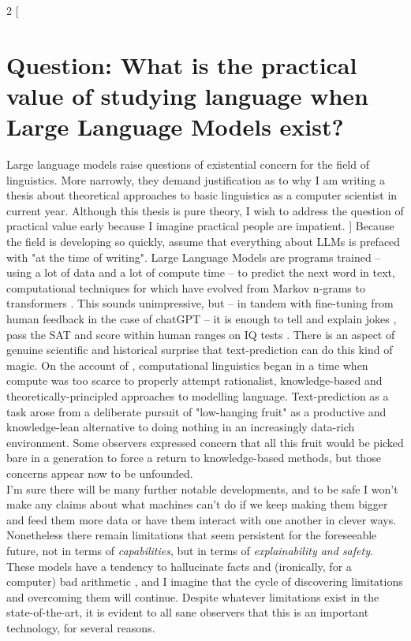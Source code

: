 \clearpage
\begin{fullwidth}
\begin{multicols}{2}
[
\section{\textbf{Question:} What is the practical value of studying language when Large Language Models exist?}
Large language models raise questions of existential concern for the field of linguistics. More narrowly, they demand justification as to why I am writing a thesis about theoretical approaches to basic linguistics as a computer scientist in current year. Although this thesis is pure theory, I wish to address the question of practical value early because I imagine practical people are impatient.
]
 Because the field is developing so quickly, assume that everything about LLMs is prefaced with "at the time of writing". Large Language Models are programs trained -- using a lot of data and a lot of compute time -- to predict the next word in text, computational techniques for which have evolved from Markov n-grams to transformers \citep{vaswani_attention_2017}. This sounds unimpressive, but -- in tandem with fine-tuning from human feedback in the case of chatGPT \citep{openai_chatgpt_2022} -- it is enough to tell and explain jokes \citep{bastian_google_2022}, pass the SAT \citep{teddy_teddynpc_i_2022} and score within human ranges on IQ tests \citep{thompson_gpt-35_2022}. There is an aspect of genuine scientific and historical surprise that text-prediction can do this kind of magic. On the account of \citep{mcshane_linguistics_2021}, computational linguistics began in a time when compute was too scarce to properly attempt rationalist, knowledge-based and theoretically-principled approaches to modelling language. Text-prediction as a task arose from a deliberate pursuit of "low-hanging fruit" as a productive and knowledge-lean alternative to doing nothing in an increasingly data-rich environment. Some observers \citep{church_pendulum_2011} expressed concern that all this fruit would be picked bare in a generation to force a return to knowledge-based methods, but those concerns appear now to be unfounded.\\

I'm sure there will be many further notable developments, and to be safe I won't make any claims about what machines can't do if we keep making them bigger and feed them more data or have them interact with one another in clever ways. Nonetheless there remain limitations that seem persistent for the foreseeable future, not in terms of \emph{capabilities}, but in terms of \emph{explainability and safety}. These models have a tendency to hallucinate facts and (ironically, for a computer) bad arithmetic \citep{hendrycks_measuring_2021}, and I imagine that the cycle of discovering limitations and overcoming them will continue. Despite whatever limitations exist in the state-of-the-art, it is evident to all sane observers that this is an important technology, for several reasons.


\end{multicols}
\end{fullwidth}
